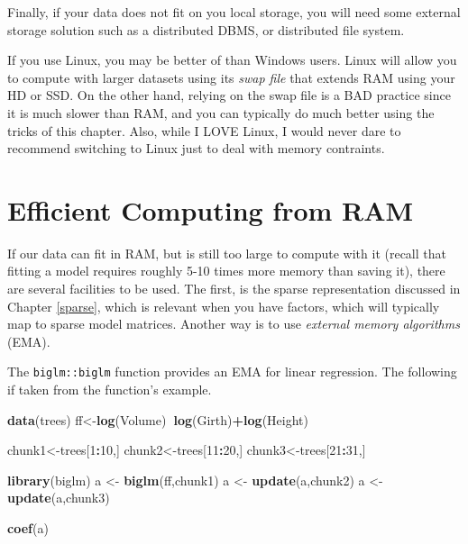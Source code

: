 \documentclass[]{book}
\newenvironment{Shaded}{\begin{snugshade}}{\end{snugshade}}
\newcommand{\KeywordTok}[1]{\textcolor[rgb]{0.13,0.29,0.53}{\textbf{#1}}}
\newcommand{\DecValTok}[1]{\textcolor[rgb]{0.00,0.00,0.81}{#1}}
\newcommand{\StringTok}[1]{\textcolor[rgb]{0.31,0.60,0.02}{#1}}
\newcommand{\OperatorTok}[1]{\textcolor[rgb]{0.81,0.36,0.00}{\textbf{#1}}}
\newcommand{\NormalTok}[1]{#1}
\theoremstyle{definition}
\theoremstyle{definition}
\theoremstyle{definition}
\theoremstyle{remark}
\let\BeginKnitrBlock\begin \let\EndKnitrBlock\end
\begin{document}
Finally, if your data does not fit on you local storage, you will need
some external storage solution such as a distributed DBMS, or
distributed file system.

\BeginKnitrBlock{remark}
{}If you use Linux, you may be better of than
Windows users. Linux will allow you to compute with larger datasets
using its \emph{swap file} that extends RAM using your HD or SSD. On the
other hand, relying on the swap file is a BAD practice since it is much
slower than RAM, and you can typically do much better using the tricks
of this chapter. Also, while I LOVE Linux, I would never dare to
recommend switching to Linux just to deal with memory contraints.
\EndKnitrBlock{remark}

\section{Efficient Computing from
RAM}\label{efficient-computing-from-ram}

If our data can fit in RAM, but is still too large to compute with it
(recall that fitting a model requires roughly 5-10 times more memory
than saving it), there are several facilities to be used. The first, is
the sparse representation discussed in Chapter \ref{sparse}, which is
relevant when you have factors, which will typically map to sparse model
matrices. Another way is to use \emph{external memory algorithms} (EMA).

The \texttt{biglm::biglm} function provides an EMA for linear
regression. The following if taken from the function's example.

\begin{Shaded}
\begin{Highlighting}[]
\KeywordTok{data}\NormalTok{(trees)}
\NormalTok{ff<-}\KeywordTok{log}\NormalTok{(Volume)}\OperatorTok{~}\KeywordTok{log}\NormalTok{(Girth)}\OperatorTok{+}\KeywordTok{log}\NormalTok{(Height)}

\NormalTok{chunk1<-trees[}\DecValTok{1}\OperatorTok{:}\DecValTok{10}\NormalTok{,]}
\NormalTok{chunk2<-trees[}\DecValTok{11}\OperatorTok{:}\DecValTok{20}\NormalTok{,]}
\NormalTok{chunk3<-trees[}\DecValTok{21}\OperatorTok{:}\DecValTok{31}\NormalTok{,]}

\KeywordTok{library}\NormalTok{(biglm)}
\NormalTok{a <-}\StringTok{ }\KeywordTok{biglm}\NormalTok{(ff,chunk1)}
\NormalTok{a <-}\StringTok{ }\KeywordTok{update}\NormalTok{(a,chunk2)}
\NormalTok{a <-}\StringTok{ }\KeywordTok{update}\NormalTok{(a,chunk3)}

\KeywordTok{coef}\NormalTok{(a)}
\end{Highlighting}
\end{Shaded}
\end{document}

